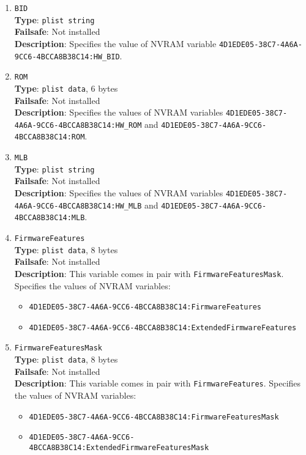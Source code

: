 \documentclass[]{article}
\providecommand{\tightlist}{%
  \setlength{\itemsep}{0pt}\setlength{\parskip}{0pt}}
\begin{document}
\begin{enumerate}
\item
  \texttt{BID}\\
  \textbf{Type}: \texttt{plist\ string}\\
  \textbf{Failsafe}: Not installed\\
  \textbf{Description}: Specifies the value of NVRAM variable
  \texttt{4D1EDE05-38C7-4A6A-9CC6-4BCCA8B38C14:HW\_BID}.

\item
  \texttt{ROM}\\
  \textbf{Type}: \texttt{plist\ data}, 6 bytes\\
  \textbf{Failsafe}: Not installed\\
  \textbf{Description}: Specifies the values of NVRAM variables
  \texttt{4D1EDE05-38C7-4A6A-9CC6-4BCCA8B38C14:HW\_ROM} and
  \texttt{4D1EDE05-38C7-4A6A-9CC6-4BCCA8B38C14:ROM}.

\item
  \texttt{MLB}\\
  \textbf{Type}: \texttt{plist\ string}\\
  \textbf{Failsafe}: Not installed\\
  \textbf{Description}: Specifies the values of NVRAM variables
  \texttt{4D1EDE05-38C7-4A6A-9CC6-4BCCA8B38C14:HW\_MLB} and
  \texttt{4D1EDE05-38C7-4A6A-9CC6-4BCCA8B38C14:MLB}.

\item
  \texttt{FirmwareFeatures}\\
  \textbf{Type}: \texttt{plist\ data}, 8 bytes\\
  \textbf{Failsafe}: Not installed\\
  \textbf{Description}: This variable comes in pair with \texttt{FirmwareFeaturesMask}.
  Specifies the values of NVRAM variables:
  \begin{itemize}
  \tightlist
  \item \texttt{4D1EDE05-38C7-4A6A-9CC6-4BCCA8B38C14:FirmwareFeatures}
  \item \texttt{4D1EDE05-38C7-4A6A-9CC6-4BCCA8B38C14:ExtendedFirmwareFeatures}
  \end{itemize}

\item
  \texttt{FirmwareFeaturesMask}\\
  \textbf{Type}: \texttt{plist\ data}, 8 bytes\\
  \textbf{Failsafe}: Not installed\\
  \textbf{Description}: This variable comes in pair with \texttt{FirmwareFeatures}.
  Specifies the values of NVRAM variables:
  \begin{itemize}
  \tightlist
  \item \texttt{4D1EDE05-38C7-4A6A-9CC6-4BCCA8B38C14:FirmwareFeaturesMask}
  \item \texttt{4D1EDE05-38C7-4A6A-9CC6-4BCCA8B38C14:ExtendedFirmwareFeaturesMask}
  \end{itemize}


\end{enumerate}
\end{document}
